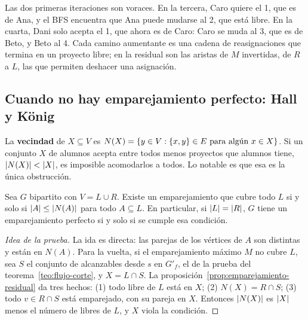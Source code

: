 \documentclass[11pt,letterpaper]{article}
\begin{document}
\begin{ejemplo}
\begin{center}
  \end{center}
  Las dos primeras iteraciones son voraces. En la tercera, Caro
  quiere el 1, que es de Ana, y el BFS encuentra que Ana puede mudarse
  al 2, que está libre. En la cuarta, Dani solo acepta el 1, que ahora
  es de Caro: Caro se muda al 3, que es de Beto, y Beto al 4. Cada
  camino aumentante es una cadena de reasignaciones que termina en un
  proyecto libre; en la residual son las aristas de $M$ invertidas, de
  $R$ a $L$, las que permiten deshacer una asignación.
\end{ejemplo}


\subsection*{Cuando no hay emparejamiento perfecto: Hall y König}

La \textbf{vecindad} de $X \subseteq V$ es
$N(X) = \left\{ y \in V : \left\{ x, y \right\} \in E \text{ para algún }
x \in X \right\}$. Si un conjunto $X$ de alumnos acepta entre todos menos
proyectos que alumnos tiene, $\left\lvert N(X) \right\rvert < \left\lvert X \right\rvert$, es imposible
acomodarlos a todos. Lo notable es que esa es la única obstrucción.

\begin{teorema}[Hall]
  \label{teo:emparejamiento-hall}
  Sea $G$ bipartito con $V = L \cup R$. Existe un emparejamiento que
  cubre todo $L$ si y solo si $\left\lvert A \right\rvert \le \left\lvert N(A) \right\rvert$ para todo
  $A \subseteq L$. En particular, si $\left\lvert L \right\rvert = \left\lvert R \right\rvert$, $G$ tiene
  un emparejamiento perfecto si y solo si se cumple esa condición.
\end{teorema}

\begin{proof}[Idea de la prueba]
  La ida es directa: las parejas de los vértices de $A$ son distintas
  y están en $N(A)$. Para la vuelta, si el emparejamiento máximo $M$
  no cubre $L$, sea $S$ el conjunto de alcanzables desde $s$ en
  $G'_f$, el de la prueba del teorema~\ref{teo:flujo-corte}, y
  $X = L \cap S$. La proposición~\ref{prop:emparejamiento-residual}
  da tres hechos: (1) todo libre de $L$ está en $X$; (2)
  $N(X) = R \cap S$; (3) todo $v \in R \cap S$ está emparejado, con
  su pareja en $X$. Entonces $\left\lvert N(X) \right\rvert$ es $\left\lvert X \right\rvert$ menos el
  número de libres de $L$, y $X$ viola la condición.
\end{proof}
\end{document}
